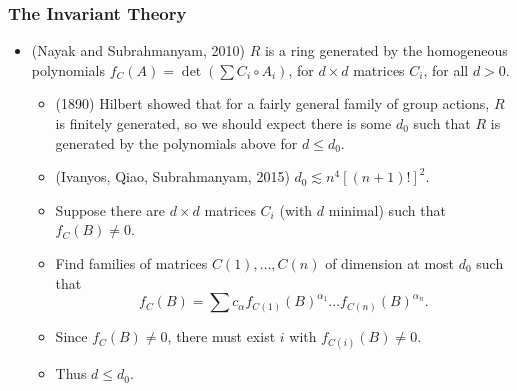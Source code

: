 \documentclass[usenames,dvipsnames,12pt]{beamer}
\begin{document}
\begin{frame}

\frametitle{The Invariant Theory}

\begin{itemize}
    \item (Nayak and Subrahmanyam, 2010) $R$ is a ring generated by the homogeneous polynomials $f_C(A) = \det(\sum C_i \circ A_i)$, for $d \times d$ matrices $C_i$, for all $d > 0$.
    \begin{itemize}
        \pause
        \item (1890) Hilbert showed that for a fairly general family of group actions, $R$ is finitely generated, so we should expect there is some $d_0$ such that $R$ is generated by the polynomials above for $d \leq d_0$.

        \pause
        \item (Ivanyos, Qiao, Subrahmanyam, 2015) $d_0 \lesssim n^4 [(n+1)!]^2$.

        \pause
        \item Suppose there are $d \times d$ matrices $C_i$ (with $d$ minimal) such that $f_C(B) \neq 0$.

        \pause
        \item Find families of matrices $C(1), \dots, C(n)$ of dimension at most $d_0$ such that
        \[ f_C(B) = \sum c_\alpha f_{C(1)}(B)^{\alpha_1} \dots f_{C(n)}(B)^{\alpha_n}.  \]

        \pause
        \item Since $f_C(B) \neq 0$, there must exist $i$ with $f_{C(i)}(B) \neq 0$.

        \pause
        \item Thus $d \leq d_0$.
    \end{itemize}
\end{itemize}

\end{frame}
\end{document}
